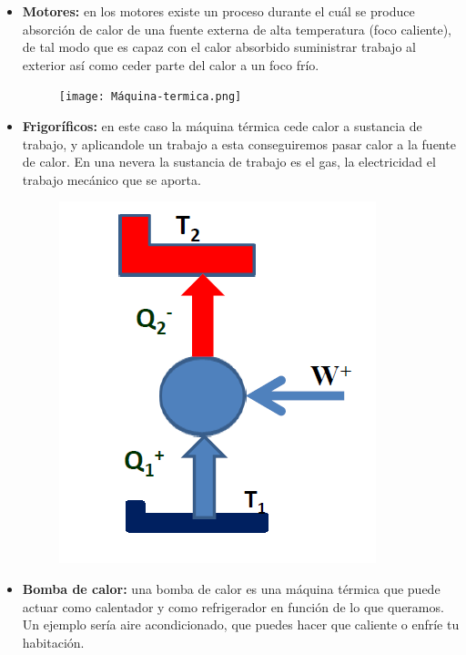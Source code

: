 \documentclass[12pt,a4paper]{article}
\begin{document}
 \begin{itemize}
 
\item \textbf{Motores:} en los motores existe un proceso durante el cuál se produce absorción de calor de una fuente externa de alta temperatura (foco caliente), de tal modo que es capaz con el calor absorbido suministrar trabajo al exterior así como ceder parte del calor a un foco frío. \\
  
\begin{figure}[h!] \centering
\texttt{[image: Máquina-termica.png]}
\end{figure} 


\item \textbf{Frigoríficos:} en este caso la máquina térmica cede calor a sustancia de trabajo, y aplicandole un trabajo a esta conseguiremos pasar calor a la fuente de calor. En una nevera la sustancia de trabajo es el gas, la electricidad el trabajo mecánico que se aporta.  

\begin{figure}[h!] \centering
\includegraphics[scale=0.6]{Máquina-frigorífica.png}
\label{fig:4-maquina-frigorifica}
\end{figure}

\item \textbf{Bomba de calor:} una bomba de calor es una máquina térmica que puede actuar como calentador y como refrigerador en función de lo que queramos. Un ejemplo sería aire acondicionado, que puedes hacer que caliente o enfríe tu habitación.

\end{itemize} 
\end{document}
